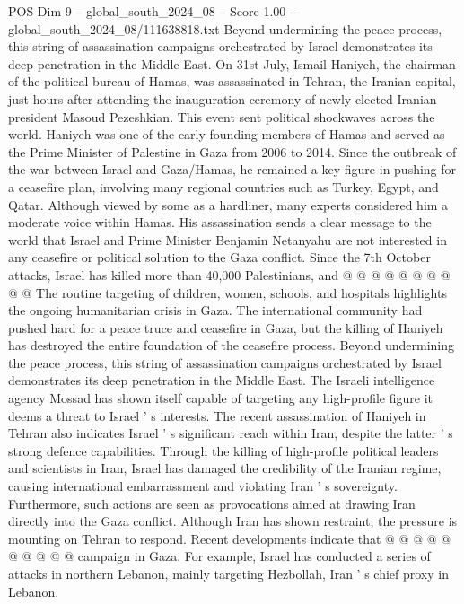 \begin{textsample}{POS Dim 9 – global\_south\_2024\_08 – Score 1.00 – global\_south\_2024\_08/111638818.txt}  \label{ex:f9_pos_058}
Beyond undermining the peace process, this string of assassination campaigns orchestrated by Israel demonstrates its deep penetration in the Middle East.
On 31st July, Ismail Haniyeh, the chairman of the political bureau of Hamas, was assassinated in Tehran, the Iranian capital, just hours after attending the inauguration ceremony of newly elected Iranian president Masoud Pezeshkian.
This event sent political shockwaves across the world.
Haniyeh was one of the early founding members of Hamas and served as the Prime Minister of Palestine in Gaza from 2006 to 2014.
Since the outbreak of the war between Israel and Gaza/Hamas, he remained a key figure in pushing for a ceasefire plan, involving many regional countries such as Turkey, Egypt, and Qatar.
Although viewed by some as a hardliner, many experts considered him a moderate voice within Hamas.
His assassination sends a clear message to the world that Israel and Prime Minister Benjamin Netanyahu are not interested in any ceasefire or political solution to the Gaza conflict.
Since the 7th October attacks, Israel has killed more than 40,000 Palestinians, and @ @ @ @ @ @ @ @ @ @ The routine targeting of children, women, schools, and hospitals highlights the ongoing humanitarian crisis in Gaza.
The international community had pushed hard for a peace truce and ceasefire in Gaza, but the killing of Haniyeh has destroyed the entire foundation of the ceasefire process.
Beyond undermining the peace process, this string of assassination campaigns orchestrated by Israel demonstrates its deep penetration in the Middle East.
The Israeli intelligence agency Mossad has shown itself capable of targeting any high-profile figure it deems a threat to Israel ' s interests.
The recent assassination of Haniyeh in Tehran also indicates Israel ' s significant reach within Iran, despite the latter ' s strong defence capabilities.
Through the killing of high-profile political leaders and scientists in Iran, Israel has damaged the credibility of the Iranian regime, causing international embarrassment and violating Iran ' s sovereignty.
Furthermore, such actions are seen as provocations aimed at drawing Iran directly into the Gaza conflict.
Although Iran has shown restraint, the pressure is mounting on Tehran to respond.
Recent developments indicate that @ @ @ @ @ @ @ @ @ @ campaign in Gaza.
For example, Israel has conducted a series of attacks in northern Lebanon, mainly targeting Hezbollah, Iran ' s chief proxy in Lebanon.

\end{textsample}
